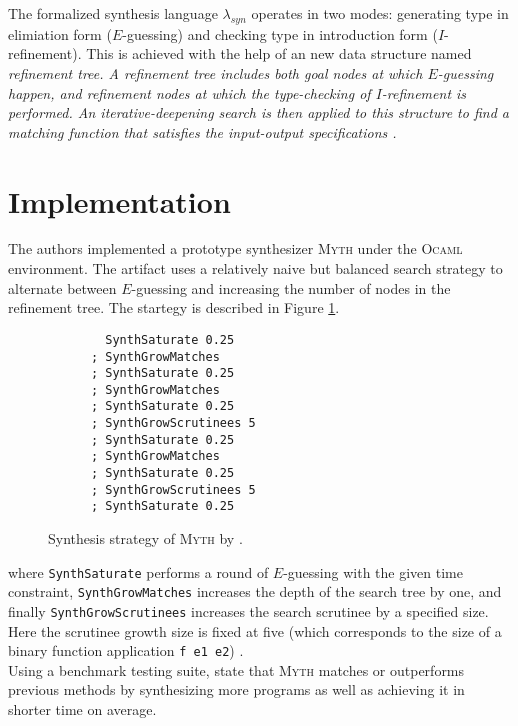 \documentclass[preprint, 11pt]{sigplanconf}
\begin{document}
The formalized synthesis language $\lambda_{syn}$ operates in two modes: generating type in elimiation form ($E$-guessing) and checking type in introduction form ($I$-refinement). This is achieved with the help of an new data structure named \em{refinement tree}. A \em{refinement tree} includes both goal nodes at which $E$-guessing happen, and refinement nodes at which the type-checking of $I$-refinement is performed. An iterative-deepening search is then applied to this structure to find a matching function that satisfies the input-output specifications \cite{osera2015type}.\\

\section{Implementation}\label{sec-impl}

The authors implemented a prototype synthesizer \textsc{Myth} under the \textsc{Ocaml} environment. The artifact uses a relatively naive but balanced search strategy to alternate between $E$-guessing and increasing the number of nodes in the refinement tree. The startegy is described in Figure \ref{fig-stra}.\\

\begin{figure}[!ht]
  \begin{center}
    \begin{verbatim}
        SynthSaturate 0.25
      ; SynthGrowMatches
      ; SynthSaturate 0.25
      ; SynthGrowMatches
      ; SynthSaturate 0.25
      ; SynthGrowScrutinees 5
      ; SynthSaturate 0.25
      ; SynthGrowMatches
      ; SynthSaturate 0.25
      ; SynthGrowScrutinees 5
      ; SynthSaturate 0.25
    \end{verbatim}
  \end{center}
  \caption{Synthesis strategy of \textsc{Myth} by \citet{osera2015type}.}
  \label{fig-stra}
\end{figure}

\noindent where \texttt{SynthSaturate} performs a round of $E$-guessing with the given time constraint, \texttt{SynthGrowMatches} increases the depth of  the search tree by one, and finally \texttt{SynthGrowScrutinees} increases the search scrutinee by a specified size. Here the scrutinee growth size is fixed at five (which corresponds to the size of a binary function application \texttt{f e1 e2}) \cite{osera2015type}. \\

Using a benchmark testing suite, \citet{osera2015type} state that \textsc{Myth} matches or outperforms previous methods by synthesizing more programs as well as achieving it in shorter time on average.\\
\end{document}
